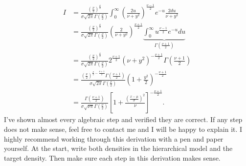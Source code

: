 \documentclass[11pt, letterpaper]{article}
\begin{document}
\begin{align*}
    I
    &= 
        \frac{(\frac{\nu}{2})^{\frac{\nu}{2}}}{\sigma\sqrt{2\pi}\Gamma(\frac{\nu}{2})} \int_{0}^{\infty}
        \left(\frac{2u}{\nu + y^2}\right)^{\frac{\nu-1}{2}} e^{-u} \frac{2du}{\nu + y^2} \\
    &=
        \frac{(\frac{\nu}{2})^{\frac{\nu}{2}}}{\sigma\sqrt{2\pi}\Gamma(\frac{\nu}{2})}
        \left(\frac{2}{\nu + y^2}\right)^{\frac{\nu + 1}{2}}
        \underset{\Gamma(\frac{\nu + 1}{2})}{\underbrace{
            \int_{0}^{\infty} u^{\frac{\nu - 1}{2}} e^{-u} du
        }} \\
    &=
    \frac{(\frac{\nu}{2})^{\frac{\nu}{2}}}{\sigma\sqrt{2\pi}\Gamma(\frac{\nu}{2})}
    2^{\frac{\nu + 1}{2}}\left(\nu + y^2\right)^{-\frac{\nu + 1}{2}}
    \Gamma\left(\frac{\nu+1}{2}\right) \\
    &=
        \frac{
            (\frac{\nu}{2})^{\frac{\nu}{2} - \frac{\nu+1}{2}}\Gamma(\frac{\nu+1}{2})
        }{
            \sigma\sqrt{2\pi}\Gamma(\frac{\nu}{2})
        }\left(1 + \frac{y^2}{2}\right)^{-\frac{\nu + 1}{2}}\\
    &=
        \frac{\Gamma(\frac{\nu + 1}{2})}{\sigma\sqrt{\nu\pi}\Gamma(\frac{\nu}{2})}\left[
            1 + \frac{\left(\frac{x - \mu}{\sigma}\right)^2}{\nu}
        \right]^{-\frac{\nu + 1}{2}}.
\end{align*}
I've shown almost every algebraic step and verified they are correct. If any step does not make sense, feel free to
contact me and I will be happy to explain it. I highly recommend working through this derivation with a pen
and paper yourself. At the start, write both densities in the hierarchical model and the target density. Then
make sure each step in this derivation makes sense.
\end{document}
